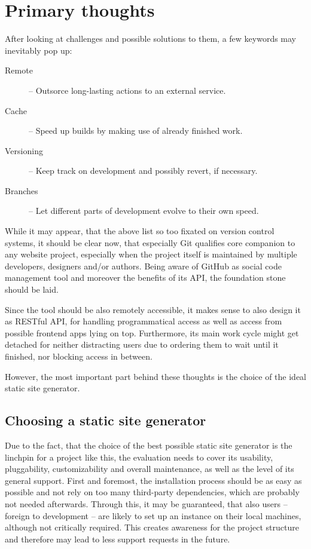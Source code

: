 \section{Primary thoughts}
\label{sec:primarythoughts}

After looking at challenges and possible solutions to them, a few keywords may inevitably pop up:

\begin{description}
  \item[Remote] -- Outsorce long-lasting actions to an external service.
  \item[Cache] -- Speed up builds by making use of already finished work.
  \item[Versioning] -- Keep track on development and possibly revert, if necessary.
  \item[Branches] -- Let different parts of development evolve to their own speed.
\end{description}

While it may appear, that the above list so too fixated on version control systems, it should be clear now, that especially Git qualifies core companion to any website project, especially when the project itself is maintained by multiple developers, designers and/or authors. Being aware of GitHub as social code management tool and moreover the benefits of its API, the foundation stone should be laid.

Since the tool should be also remotely accessible, it makes sense to also design it as RESTful API, for handling programmatical access as well as access from possible frontend apps lying on top. Furthermore, its main work cycle might get detached for neither distracting users due to ordering them to wait until it finished, nor blocking access in between.

However, the most important part behind these thoughts is the choice of the ideal static site generator.


\subsection{Choosing a static site generator}
\label{sec:primarythoughts-generator}

Due to the fact, that the choice of the best possible static site generator is the linchpin for a project like this, the evaluation needs to cover its usability, pluggability, customizability and overall maintenance, as well as the level of its general support. First and foremost, the installation process should be as easy as possible and not rely on too many third-party dependencies, which are probably not needed afterwards. Through this, it may be guaranteed, that also users -- foreign to development -- are likely to set up an instance on their local machines, although not critically required. This creates awareness for the project structure and therefore may lead to less support requests in the future.

